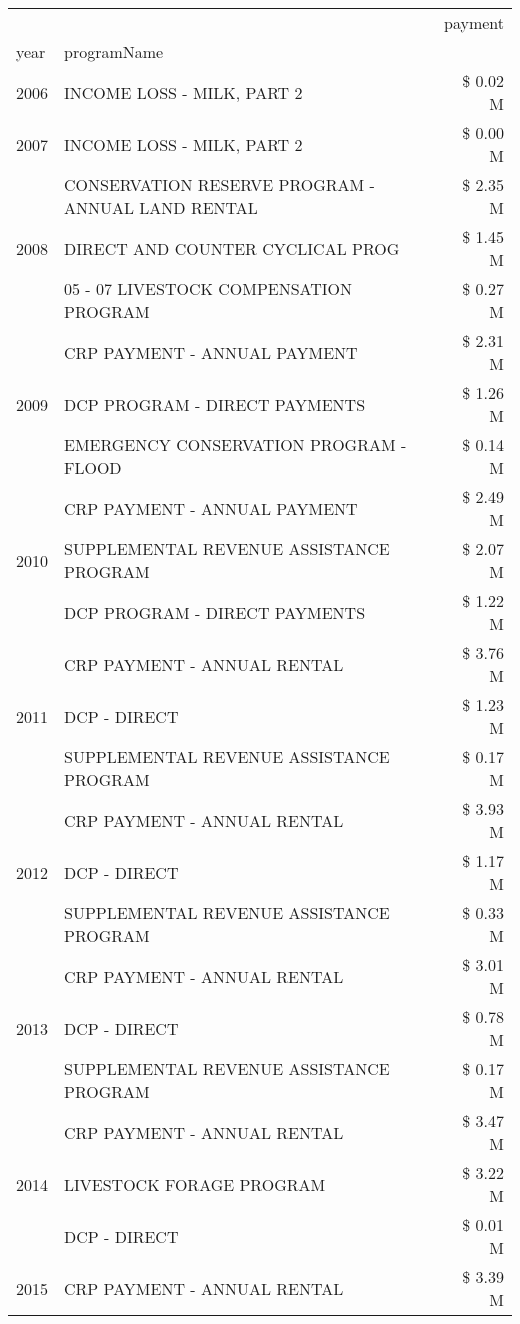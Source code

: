 \begin{tabular}{llr}
\toprule
 &  & payment \\
year & programName &  \\
\midrule
2006 & INCOME LOSS - MILK, PART 2 & \$ 0.02 M \\
\cline{1-3}
2007 & INCOME LOSS - MILK, PART 2 & \$ 0.00 M \\
\cline{1-3}
\multirow[t]{3}{*}{2008} & CONSERVATION RESERVE PROGRAM - ANNUAL LAND RENTAL & \$ 2.35 M \\
 & DIRECT AND COUNTER CYCLICAL PROG & \$ 1.45 M \\
 & 05 - 07 LIVESTOCK COMPENSATION PROGRAM & \$ 0.27 M \\
\cline{1-3}
\multirow[t]{3}{*}{2009} & CRP PAYMENT - ANNUAL PAYMENT & \$ 2.31 M \\
 & DCP PROGRAM - DIRECT PAYMENTS & \$ 1.26 M \\
 & EMERGENCY CONSERVATION PROGRAM - FLOOD & \$ 0.14 M \\
\cline{1-3}
\multirow[t]{3}{*}{2010} & CRP PAYMENT - ANNUAL PAYMENT & \$ 2.49 M \\
 & SUPPLEMENTAL REVENUE ASSISTANCE PROGRAM & \$ 2.07 M \\
 & DCP PROGRAM - DIRECT PAYMENTS & \$ 1.22 M \\
\cline{1-3}
\multirow[t]{3}{*}{2011} & CRP PAYMENT - ANNUAL RENTAL & \$ 3.76 M \\
 & DCP - DIRECT & \$ 1.23 M \\
 & SUPPLEMENTAL REVENUE ASSISTANCE PROGRAM & \$ 0.17 M \\
\cline{1-3}
\multirow[t]{3}{*}{2012} & CRP PAYMENT - ANNUAL RENTAL & \$ 3.93 M \\
 & DCP - DIRECT & \$ 1.17 M \\
 & SUPPLEMENTAL REVENUE ASSISTANCE PROGRAM & \$ 0.33 M \\
\cline{1-3}
\multirow[t]{3}{*}{2013} & CRP PAYMENT - ANNUAL RENTAL & \$ 3.01 M \\
 & DCP - DIRECT & \$ 0.78 M \\
 & SUPPLEMENTAL REVENUE ASSISTANCE PROGRAM & \$ 0.17 M \\
\cline{1-3}
\multirow[t]{3}{*}{2014} & CRP PAYMENT - ANNUAL RENTAL & \$ 3.47 M \\
 & LIVESTOCK FORAGE PROGRAM & \$ 3.22 M \\
 & DCP - DIRECT & \$ 0.01 M \\
\cline{1-3}
\multirow[t]{3}{*}{2015} & CRP PAYMENT - ANNUAL RENTAL & \$ 3.39 M \\

\end{tabular}
